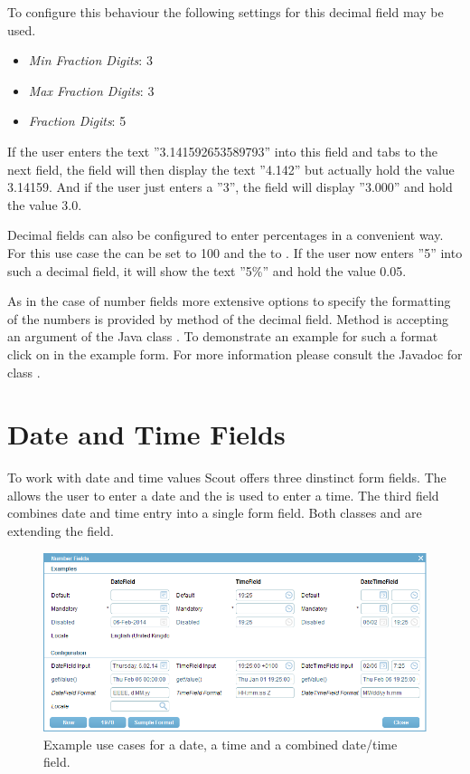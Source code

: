 \documentclass[a4paper,10pt,twoside]{book}
\begin{document}
{To configure this behaviour the following settings for this decimal field may be used.

\begin{itemize}
  \item \textit{Min Fraction Digits}: 3
  \item \textit{Max Fraction Digits}: 3
  \item \textit{Fraction Digits}: 5
\end{itemize}

If the user enters the text ''3.141592653589793'' into this field and tabs to the next field, the field will then display the text ''4.142'' but actually hold the value 3.14159. 
And if the user just enters a ''3'', the field will display ''3.000'' and hold the value 3.0.

Decimal fields can also be configured to enter percentages in a convenient way. 
For this use case the  can be set to 100 and the  to . 
If the user now enters ''5'' into such a decimal field, it will show the text ''5\%'' and hold the value 0.05.

As in the case of number fields more extensive options to specify the formatting of the numbers is provided by  method of the decimal field. 
Method  is accepting an argument of the Java class . 
To demonstrate an example for such a format click on  in the example form. 
For more information please consult the Javadoc for class .

\section{Date and Time Fields}

To work with date and time values Scout offers three dinstinct form fields. 
The  allows the user to enter a date and the  is used to enter a time. 
The third field  combines date and time entry into a single form field. 
Both classes  and  are extending the  field.

\begin{figure}
\includegraphics[width=15cm]{datetimefield.png}
\caption{Example use cases for a date, a time and a combined date/time field.
}
\end{figure}

}
\end{document}

